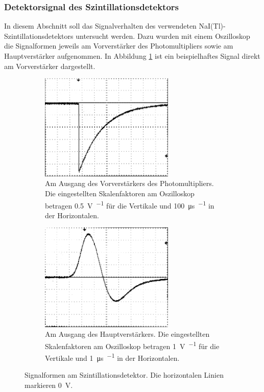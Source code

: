 \documentclass[11pt, a4paper]{article}
\numberwithin{equation}{section}
\begin{document}
\subsubsection{Detektorsignal des Szintillationsdetektors}
\label{sec:detektorsignal_szinti}
In diesem Abschnitt soll das Signalverhalten des verwendeten NaI(Tl)-Szintillationsdetektors untersucht werden.
Dazu wurden mit einem Oszilloskop die Signalformen jeweils am Vorverstärker des Photomultipliers sowie am Hauptverstärker aufgenommen.
In Abbildung \ref{fig:signal_szinti_vor} ist ein beispielhaftes Signal direkt am Vorverstärker dargestellt.
\begin{figure}[h]
	\centering
	\begin{subfigure}[b]{0.7\textwidth}
		\centering
		\includegraphics[width=0.7\textwidth]{./figures/signale/vor_szinti_abgeschnitten.jpg}
		\caption{Am Ausgang des Vorverstärkers des Photomultipliers. Die eingestellten Skalenfaktoren am Oszilloskop betragen \SI{0.5}{\volt\per\division} für die Vertikale und \SI{100}{\micro\second\per\division} in der Horizontalen.}
		\label{fig:signal_szinti_vor}
	\end{subfigure}
	
	\begin{subfigure}[b]{0.7\textwidth}
		\centering
		\includegraphics[width=0.7\textwidth]{./figures/signale/haupt_szinti_abgeschnitten.jpg}
		\caption{Am Ausgang des Hauptverstärkers. Die eingestellten Skalenfaktoren am Oszilloskop betragen \SI{1}{\volt\per\division} für die Vertikale und \SI{1}{\micro\second\per\division} in der Horizontalen.}
		\label{fig:signal_szinti_haupt}
	\end{subfigure}
	\caption{Signalformen am Szintillationsdetektor. Die horizontalen Linien markieren \SI{0}{\volt}.}
\end{figure}
\end{document}
